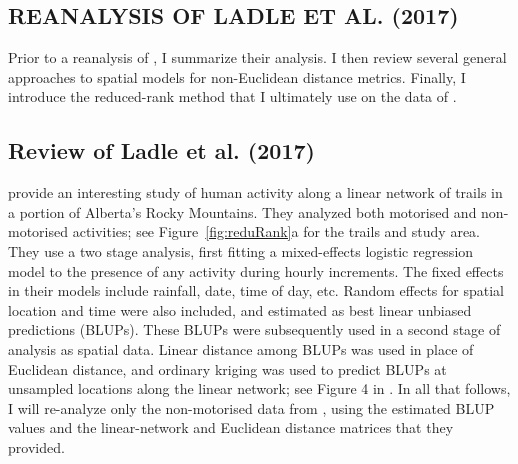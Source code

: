 \documentclass[11pt, titlepage]{article}\usepackage[]{graphicx}\usepackage[]{color}
\begin{document}
\begin{spacing}{1.9}
\begin{flushleft}
\section*{REANALYSIS OF LADLE ET AL. (2017)}

Prior to a reanalysis of \citet{Ladl:Avga:Whea:Boyc:pred:2016}, I summarize their analysis.  I then review several general approaches to spatial models for non-Euclidean distance metrics. Finally, I introduce the reduced-rank method that I ultimately use on the data of \citet{Ladl:Avga:Whea:Boyc:pred:2016}.

\subsection*{Review of Ladle et al. (2017)}

\citet{Ladl:Avga:Whea:Boyc:pred:2016} provide an interesting study of human activity along a linear network of trails in a portion of Alberta's Rocky Mountains.  They analyzed both motorised and non-motorised activities; see Figure~\ref{fig:reduRank}a for the trails and study area.  They use a two stage analysis, first fitting a mixed-effects logistic regression model to the presence of any activity during hourly increments.  The fixed effects in their models include rainfall, date, time of day, etc.  Random effects for spatial location and time were also included, and estimated as best linear unbiased predictions (BLUPs). These BLUPs were subsequently used in a second stage of analysis as spatial data.  Linear distance among BLUPs was used in place of Euclidean distance, and ordinary kriging was used to predict BLUPs at unsampled locations along the linear network; see Figure 4 in \citet{Ladl:Avga:Whea:Boyc:pred:2016}. In all that follows, I will re-analyze only the non-motorised data from \citet{Ladl:Avga:Whea:Boyc:pred:2016}, using the estimated BLUP values and the linear-network and Euclidean distance matrices that they provided. 


\end{flushleft}
\end{spacing}
\end{document}
